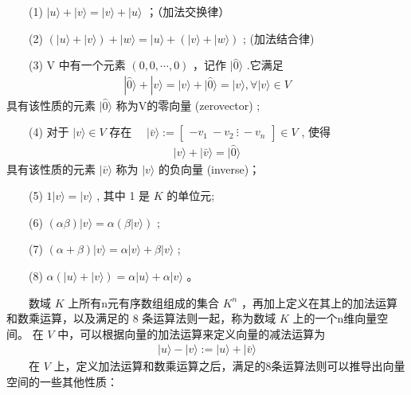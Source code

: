 \documentclass[a4paper,11pt,english]{sphinxmanual}
\begin{document}
\sphinxAtStartPar
  (1) \(| {u}\rangle+| {v}\rangle=| {v}\rangle+| {u}\rangle\) ；（加法交换律）

\sphinxAtStartPar
  (2) \((|u\rangle+|v\rangle)+|w\rangle=|u\rangle+(|v\rangle+|w\rangle)\) ; (加法结合律)

\sphinxAtStartPar
  (3) \(\mathrm{V}\) 中有一个元素  \((0,0, \cdots, 0)\) ，记作  \(|\hat{0}\rangle\) .它满足
\begin{equation*}
\begin{split}|\hat{0}\rangle+|v\rangle=|v\rangle+|\hat{0}\rangle=|v\rangle, \forall|v\rangle \in V\end{split}
\end{equation*}
\sphinxAtStartPar
​具有该性质的元素  \(|\hat{0}\rangle\) 称为V的零向量 (zero\sphinxhyphen{}vector) ;

\sphinxAtStartPar
  (4) 对于  \(|v\rangle \in V\) 存在  \(\quad|\bar{v}\rangle:=\left[\begin{array}{c}-v_{1} \ -v_{2} \ \vdots \ -v_{n}\end{array}\right] \in V\) , 使得
\begin{equation*}
\begin{split}|v\rangle+|\bar{v}\rangle=|\hat{0}\rangle\end{split}
\end{equation*}
\sphinxAtStartPar
​具有该性质的元素  \(|\bar{v}\rangle\) 称为  \(|v\rangle\) 的负向量 (inverse)；

\sphinxAtStartPar
  (5)  \(1|v\rangle=|v\rangle\) , 其中 1 是  \(K\) 的单位元;

\sphinxAtStartPar
  (6)  \((\alpha \beta)|v\rangle=\alpha(\beta|v\rangle)\) ;

\sphinxAtStartPar
  (7)  \((\alpha+\beta)|v\rangle=\alpha| {v}\rangle+\beta|v\rangle\) ;

\sphinxAtStartPar
  (8)  \(\alpha(|u\rangle+|v\rangle)=\alpha|u\rangle+\alpha|v\rangle\) 。

\sphinxAtStartPar
​  数域 \(K\) 上所有n元有序数组组成的集合  \(K^{n}\) ，再加上定义在其上的加法运算和数乘运算，以及满足的 8 条运算法则一起，称为数域 \(K\) 上的一个n维向量空间。 在 \(V\) 中，可以根据向量的加法运算来定义向量的减法运算为
\begin{equation*}
\begin{split}|u\rangle-|v\rangle:=|u\rangle+|\bar{v}\rangle\end{split}
\end{equation*}
\sphinxAtStartPar
​  在 \(V\) 上，定义加法运算和数乘运算之后，满足的8条运算法则可以推导出向量空间的一些其他性质：
\end{document}

